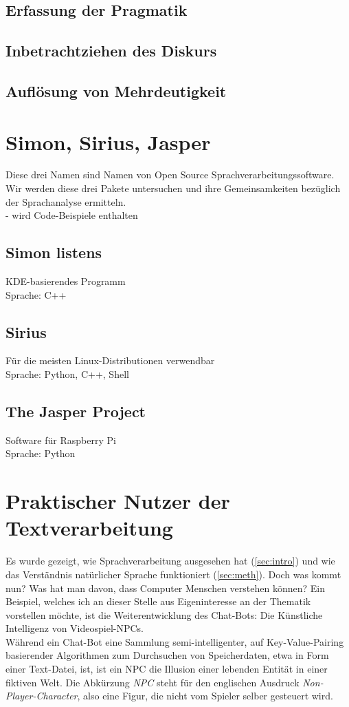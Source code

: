 \documentclass[12pt,twoside]{article}
\theoremstyle{plain}
\theoremstyle{definition}
\theoremstyle{remark}
\begin{document}
{	\subsection{Erfassung der Pragmatik}
	\label{ssec:prag}
	\subsection{Inbetrachtziehen des Diskurs}
	\label{ssec:disc}
	\subsection{Auflösung von Mehrdeutigkeit}
	\label{ssec:ambi}

\section{Simon, Sirius, Jasper}
\label{sec:software}
Diese drei Namen sind Namen von Open Source Sprachverarbeitungssoftware.
Wir werden diese drei Pakete untersuchen und ihre Gemeinsamkeiten bezüglich der Sprachanalyse ermitteln. \\
- wird Code-Beispiele enthalten
	\subsection{Simon listens}
	\label{ssec:simon}
	KDE-basierendes Programm\\
	Sprache: C++
	\subsection{Sirius}
	\label{ssec:sirius}
	Für die meisten Linux-Distributionen verwendbar\\
	Sprache: Python, C++, Shell
	\subsection{The Jasper Project}
	\label{ssec:jasper}
	Software für Raspberry Pi\\
	Sprache: Python
\section{Praktischer Nutzer der Textverarbeitung}
\label{sec:ausb}
Es wurde gezeigt, wie Sprachverarbeitung ausgesehen hat (\ref{sec:intro}) und wie das Verständnis natürlicher Sprache funktioniert (\ref{sec:meth}).
Doch was kommt nun?
Was hat man davon, dass Computer Menschen verstehen können?
Ein Beispiel, welches ich an dieser Stelle aus Eigeninteresse an der Thematik vorstellen möchte, ist die Weiterentwicklung des Chat-Bots: Die Künstliche Intelligenz von Videospiel-NPCs.\\
Während ein Chat-Bot eine Sammlung semi-intelligenter, auf Key-Value-Pairing basierender Algorithmen zum Durchsuchen von Speicherdaten, etwa in Form einer Text-Datei, ist, ist ein NPC die Illusion einer lebenden Entität in einer fiktiven Welt. Die Abkürzung \textit{NPC} steht für den englischen Ausdruck \textit{Non-Player-Character}, also eine Figur, die nicht vom Spieler selber gesteuert wird.\\

}
\end{document}
